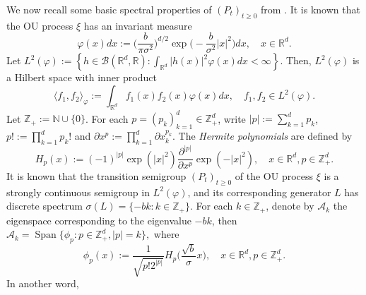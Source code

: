 \documentclass[12pt,a4paper]{amsart}
\theoremstyle{plain}
\theoremstyle{definition}
\numberwithin{equation}{section}
\begin{document}
    We now recall some basic spectral properties of $(P_t)_{t\geq 0}$ from \cite{MetafunePallaraPriola2002Spectrum}.
    It is known that the OU process $\xi$ has an invariant measure
\begin{equation}
\label{invariantdensity}
    \varphi(x)dx
    :=\Big (\frac{b}{\pi \sigma^2}\Big )^{d/2}\exp \Big(-\frac{b}{\sigma^2}|x|^2 \Big)dx,
    \quad x\in \mathbb R^d.
\end{equation}
    Let $L^2(\varphi):= \left\{ h  \in \mathcal B(\mathbb R^d, \mathbb R): \int_{\mathbb R^d} |h(x)|^2 \varphi(x) dx < \infty \right\}$. 
    Then, $L^2(\varphi)$ is a Hilbert space with inner product
\begin{equation}
    \langle f_1, f_2 \rangle_{\varphi}
    := \int_{\mathbb R^d}f_1(x)f_2(x)\varphi(x) dx, \quad f_1,f_2 \in L^2(\varphi).
\end{equation}
    Let $\mathbb Z_+ := \mathbb N\cup\{0\}$.
    For each $p = (p_k)_{k = 1}^d \in \mathbb{Z}_+^{d}$, write $|p|:=\sum_{k=1}^d p_k$, $p!:= \prod_{k= 1}^d p_k !$ and $\partial x^p:= \prod_{k = 1}^d\partial x_k^{p_k}$.
    The \emph{Hermite polynomials} are defined by
\begin{equation}
    H_p(x)
    :=(-1)^{|p|}\exp(|x|^2) \frac{\partial ^{|p|}}{\partial x^p} \exp(-|x|^2) ,
    \quad x\in \mathbb R^d,
    p \in \mathbb{Z}_+^{d}.
\end{equation}
    It is known that the transition semigroup $(P_t)_{t\geq 0}$ of the OU process $\xi$ is a strongly continuous semigroup in $L^2(\varphi)$, and its corresponding generator $L$ has discrete spectrum 
    $\sigma(L)= \{-bk: k \in \mathbb Z_+\}$.
    For each $k \in \mathbb Z_+$, denote by $\mathcal{A}_k$ the eigenspace corresponding to the eigenvalue $-bk$, then
$
    \mathcal{A}_k
    = \operatorname{Span} \{\phi_p : p\in \mathbb Z_+^d, |p|=k\},
$
    where
\begin{equation}\label{eigenfunction}
    \phi_p(x)
    := \frac{1}{\sqrt{ p! 2^{|p|} }} H_p \Big(\frac{ \sqrt{b} }{\sigma}x \Big),
    \quad x\in \mathbb R^d, p\in \mathbb Z_+^d.
\end{equation}
    In another word,
\end{document}
